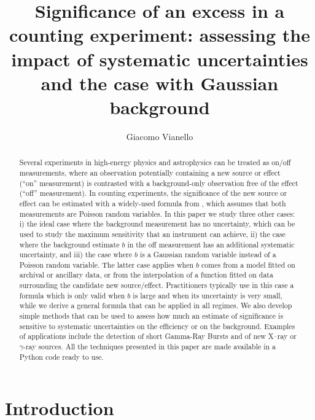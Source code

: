 \documentclass[twocolumn]{aastex61}
\begin{document}
\title{Significance of an excess in a counting experiment: assessing the impact of systematic uncertainties and the case with Gaussian background}


\author{Giacomo Vianello}


\begin{abstract}
Several experiments in high-energy physics and astrophysics can be treated as on/off measurements, where an observation potentially containing a new source or effect (``on'' measurement) is contrasted with a background-only observation free of the effect (``off'' measurement). In counting experiments, the significance of the new source or effect can be estimated with a widely-used formula from \citet{LiMa}, which assumes that both measurements are Poisson random variables. In this paper we study three other cases: i) the ideal case where the background measurement has no uncertainty, which can be used to study the maximum sensitivity that an instrument can achieve, ii) the case where the background estimate $b$ in the off measurement has an additional systematic uncertainty, and iii) the case where $b$ is a Gaussian random variable instead of a Poisson random variable. The latter case applies when $b$ comes from a model fitted on archival or ancillary data, or from the interpolation of a function fitted on data surrounding the candidate new source/effect. Practitioners typically use in this case a formula which is only valid when $b$ is large and when its uncertainty is very small, while we derive a general formula that can be applied in all regimes. We also develop simple methods that can be used to assess how much an estimate of significance is sensitive to systematic uncertainties on the efficiency or on the background. Examples of applications include the detection of short Gamma-Ray Bursts and of new X--ray or $\gamma$-ray sources. All the techniques presented in this paper are made available in a Python code ready to use.
\end{abstract}


\section{Introduction}
\end{document}
